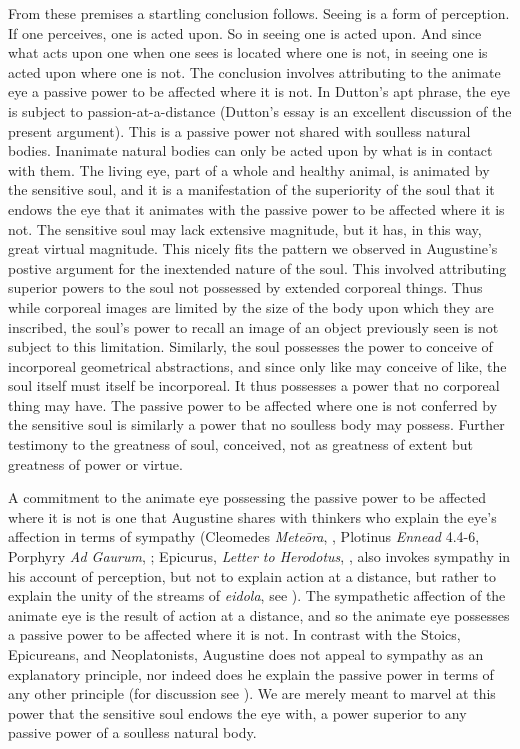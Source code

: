 \documentclass[12pt]{article}
\begin{document}
From these premises a startling conclusion follows. Seeing is a form of perception. If one perceives, one is acted upon. So in seeing one is acted upon. And since what acts upon one when one sees is located where one is not, in seeing one is acted upon where one is not. The conclusion involves attributing to the animate eye a passive power to be affected where it is not. In Dutton's \citeyearpar{Dutton:2020aa} apt phrase, the eye is subject to passion-at-a-distance (Dutton's essay is an excellent discussion of the present argument). This is a passive power not shared with soulless natural bodies. Inanimate natural bodies can only be acted upon by what is in contact with them. The living eye, part of a whole and healthy animal, is animated by the sensitive soul, and it is a manifestation of the superiority of the soul that it endows the eye that it animates with the passive power to be affected where it is not. The sensitive soul may lack extensive magnitude, but it has, in this way, great virtual magnitude. This nicely fits the pattern we observed in Augustine's postive argument for the inextended nature of the soul. This involved attributing superior powers to the soul not possessed by extended corporeal things. Thus while corporeal images are limited by the size of the body upon which they are inscribed, the soul's power to recall an image of an object previously seen is not subject to this limitation. Similarly, the soul possesses the power to conceive of incorporeal geometrical abstractions, and since only like may conceive of like, the soul itself must itself be incorporeal. It thus possesses a power that no corporeal thing may have. The passive power to be affected where one is not conferred by the sensitive soul is similarly a power that no soulless body may possess. Further testimony to the greatness of soul, conceived, not as greatness of extent but greatness of power or virtue.

A commitment to the animate eye possessing the passive power to be affected where it is not is one that Augustine shares with thinkers who explain the eye's affection in terms of sympathy (Cleomedes \emph{Meteōra}, \citealt{Todd:1990aa}, Plotinus \emph{Ennead} 4.4-6, Porphyry \emph{Ad Gaurum}, \citealt{Kalbfleisch:1895aa}; Epicurus, \emph{Letter to Herodotus}, \citealt{Marcovich:1999aa}, also invokes sympathy in his account of perception, but not to explain action at a distance, but rather to explain the unity of the streams of \emph{eidola}, see \citealt{Lee:1978yz}). The sympathetic affection of the animate eye is the result of action at a distance, and so the animate eye possesses a passive power to be affected where it is not. In contrast with the Stoics, Epicureans, and Neoplatonists, Augustine does not appeal to sympathy as an explanatory principle, nor indeed does he explain the passive power in terms of any other principle (for discussion see \citealt[168 n53]{Gannon:1956aa}). We are merely meant to marvel at this power that the sensitive soul endows the eye with, a power superior to any passive power of a soulless natural body.
\end{document}
